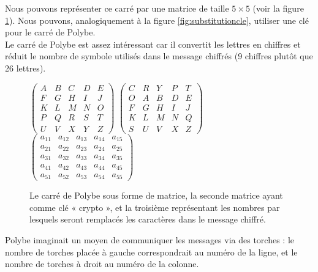 Nous pouvons représenter ce carré par une matrice de taille $5\times5$
(voir la figure \ref{fig:polybe}). Nous pouvons, analogiquement à la
figure \ref{fig:substitutioncle}, utiliser une clé pour le carré de
Polybe. \\

Le carré de Polybe est assez intéressant car il convertit les lettres
en chiffres et réduit le nombre de symbole utilisés dans le message
chiffrés (9 chiffres plutôt que 26 lettres). \\

\begin{figure}[h]
  $
  \left(
    \begin{array}{ccccc}
      A & B & C & D & E \\
      F & G & H & I & J \\
      K & L & M & N & O \\
      P & Q & R & S & T \\
      U & V & X & Y & Z
    \end{array}
  \right)
  $
  \hfill
  $
  \left(
    \begin{array}{ccccc}
      C & R & Y & P & T \\
      O & A & B & D & E \\
      F & G & H & I & J \\
      K & L & M & N & Q \\
      S & U & V & X & Z
    \end{array}
  \right)
  $
  \hfill
  $
  \left(
    \begin{array}{ccccc}
      a_{11} & a_{12} & a_{13} & a_{14} & a_{15}  \\
      a_{21} & a_{22} & a_{23} & a_{24} & a_{25}  \\
      a_{31} & a_{32} & a_{33} & a_{34} & a_{35}  \\
      a_{41} & a_{42} & a_{43} & a_{44} & a_{45}  \\
      a_{51} & a_{52} & a_{53} & a_{54} & a_{55}
    \end{array}
  \right)
  $
  \caption{Le carré de Polybe sous forme de matrice, la seconde
    matrice ayant comme clé « crypto », et la troisième représentant
    les nombres par lesquels seront remplacés les caractères dans le
    message chiffré.}
  \label{fig:polybe}
\end{figure}

Polybe imaginait un moyen de communiquer les messages via des torches
: le nombre de torches placée à gauche correspondrait au numéro de la
ligne, et le nombre de torches à droit au numéro de la colonne. \\

